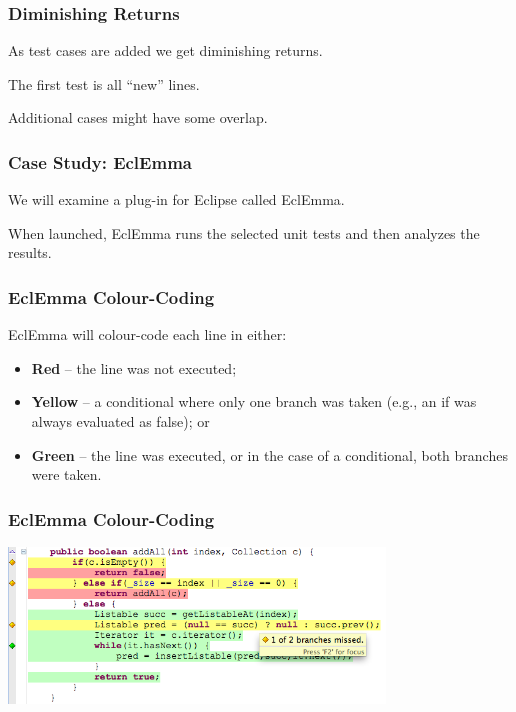 \begin{frame}
\frametitle{Diminishing Returns}
\begin{changemargin}{1cm}
As test cases are added we get diminishing returns.

The first test is all ``new'' lines.

Additional cases might have some overlap.

\end{changemargin}
\end{frame}

\begin{frame}
\frametitle{Case Study: EclEmma}
\begin{changemargin}{1cm}
We will examine a plug-in for Eclipse called EclEmma.

When launched, EclEmma runs the selected unit tests and then analyzes the results.

\end{changemargin}
\end{frame}

\begin{frame}
\frametitle{EclEmma Colour-Coding}
\begin{changemargin}{1cm}


EclEmma will colour-code each line in either:
\begin{itemize}
	\item \textbf{Red} -- the line was not executed;
	\item \textbf{Yellow} -- a conditional where only one branch was taken (e.g., an if was always evaluated as false); or
	\item \textbf{Green} -- the line was executed, or in the case of a conditional, both branches were taken.
\end{itemize}

\end{changemargin}
\end{frame}

\begin{frame}
\frametitle{EclEmma Colour-Coding}
\begin{center}
	\includegraphics[width=0.75\textwidth]{images/annotations.png}
\end{center}
\end{frame}

